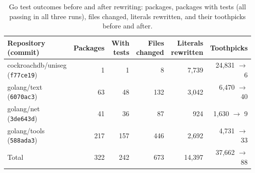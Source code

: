 \begin{table}[h]
\begin{center}
\begin{footnotesize}
\begin{tabular}{lrrrrr}
\hline
Repository (commit)	& Packages	& With tests	& Files changed	& Literals rewritten	& Toothpicks	\\
\hline
cockroachdb/uniseg (\texttt{f77ce19})	& 1	& 1	& 8	& 7{,}739	& 24{,}831 $\to$ 6	\\
golang/text (\texttt{6070ac3})	& 63	& 48	& 132	& 3{,}042	& 6{,}470 $\to$ 40	\\
golang/net (\texttt{3de643d})	& 41	& 36	& 87	& 924	& 1{,}630 $\to$ 9	\\
golang/tools (\texttt{588ada3})	& 217	& 157	& 446	& 2{,}692	& 4{,}731 $\to$ 33	\\
\hline
Total	& 322	& 242	& 673	& 14{,}397	& 37{,}662 $\to$ 88	\\
\hline
\end{tabular}
\end{footnotesize}
\end{center}
\caption{Go test outcomes before and after rewriting:
	packages, packages with tests (all passing in all three runs),
	files changed, literals rewritten, and their toothpicks before and after.}
\label{tab:app:go}
\end{table}
